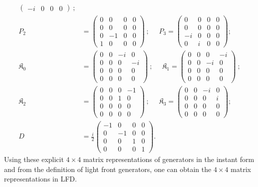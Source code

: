 \documentclass[aps,reprint,notitlepage,nofootinbib,superscriptaddress]{revtex4-1}
\begin{document}
\begin{align}
\begin{pmatrix}
    -i&0&0&0
    \end{pmatrix}~;\nonumber\\
    P_2&=\begin{pmatrix}
    0&0&0&0\\
    0&0&0&0\\
    0&-1&0&0\\
    1&0&0&0
    \end{pmatrix}~;~~~~~~P_3=\begin{pmatrix}
    0&0&0&0\\
    0&0&0&0\\
    -i&0&0&0\\
    0&i&0&0
    \end{pmatrix};\nonumber\\
    \mathfrak{K}_0&=\begin{pmatrix}
    0&0&-i&0\\
    0&0&0&-i\\
    0&0&0&0\\
    0&0&0&0
    \end{pmatrix}~;~~~~~~\mathfrak{K}_1=\begin{pmatrix}
    0&0&0&-i\\
    0&0&-i&0\\
    0&0&0&0\\
    0&0&0&0
    \end{pmatrix}~;\nonumber\\
    \mathfrak{K}_2&=\begin{pmatrix}
    0&0&0&-1\\
    0&0&1&0\\
    0&0&0&0\\
    0&0&0&0
    \end{pmatrix}~;~~~~~~\mathfrak{K}_3=\begin{pmatrix}
    0&0&-i&0\\
    0&0&0&i\\
    0&0&0&0\\
    0&0&0&0
    \end{pmatrix};\nonumber\\
    D&=\frac{i}{2}\begin{pmatrix}
    -1&0&0&0\\
    0&-1&0&0\\
    0&0&1&0\\
    0&0&0&1
    \end{pmatrix}.
\end{align}
Using these explicit $4\times4$ matrix representations of generators in the instant form and from the definition of light front generators, one can obtain the $4\times4$ matrix representations in LFD.
\end{document}
